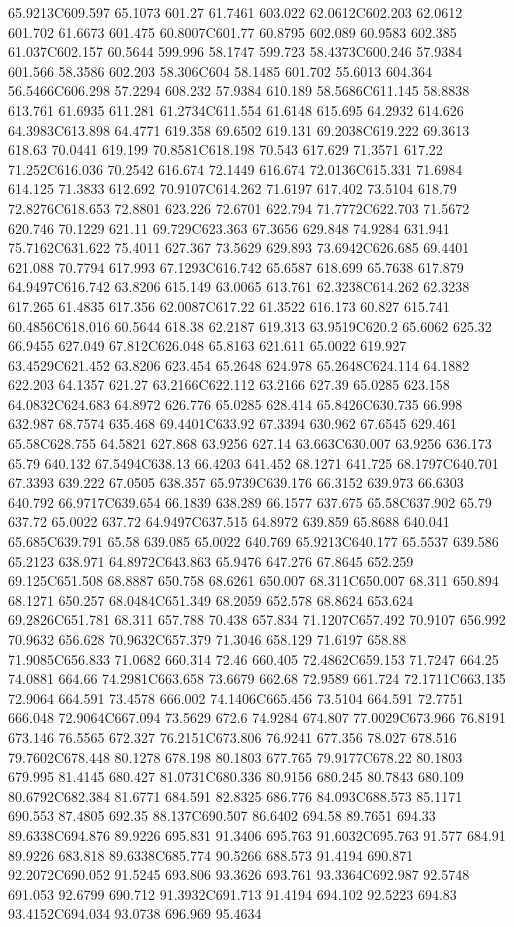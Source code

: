65.9213C609.597 65.1073 601.27 61.7461 603.022 62.0612C602.203 62.0612 601.702 61.6673 601.475 60.8007C601.77 60.8795 602.089 60.9583 602.385 61.037C602.157 60.5644 599.996 58.1747 599.723 58.4373C600.246 57.9384 601.566 58.3586 602.203 58.306C604 58.1485 601.702 55.6013 604.364 56.5466C606.298 57.2294 608.232 57.9384 610.189 58.5686C611.145 58.8838 613.761 61.6935 611.281 61.2734C611.554 61.6148 615.695 64.2932 614.626 64.3983C613.898 64.4771 619.358 69.6502 619.131 69.2038C619.222 69.3613 618.63 70.0441 619.199 70.8581C618.198 70.543 617.629 71.3571 617.22 71.252C616.036 70.2542 616.674 72.1449 616.674 72.0136C615.331 71.6984 614.125 71.3833 612.692 70.9107C614.262 71.6197 617.402 73.5104 618.79 72.8276C618.653 72.8801 623.226 72.6701 622.794 71.7772C622.703 71.5672 620.746 70.1229 621.11 69.729C623.363 67.3656 629.848 74.9284 631.941 75.7162C631.622 75.4011 627.367 73.5629 629.893 73.6942C626.685 69.4401 621.088 70.7794 617.993 67.1293C616.742 65.6587 618.699 65.7638 617.879 64.9497C616.742 63.8206 615.149 63.0065 613.761 62.3238C614.262 62.3238 617.265 61.4835 617.356 62.0087C617.22 61.3522 616.173 60.827 615.741 60.4856C618.016 60.5644 618.38 62.2187 619.313 63.9519C620.2 65.6062 625.32 66.9455 627.049 67.812C626.048 65.8163 621.611 65.0022 619.927 63.4529C621.452 63.8206 623.454 65.2648 624.978 65.2648C624.114 64.1882 622.203 64.1357 621.27 63.2166C622.112 63.2166 627.39 65.0285 623.158 64.0832C624.683 64.8972 626.776 65.0285 628.414 65.8426C630.735 66.998 632.987 68.7574 635.468 69.4401C633.92 67.3394 630.962 67.6545 629.461 65.58C628.755 64.5821 627.868 63.9256 627.14 63.663C630.007 63.9256 636.173 65.79 640.132 67.5494C638.13 66.4203 641.452 68.1271 641.725 68.1797C640.701 67.3393 639.222 67.0505 638.357 65.9739C639.176 66.3152 639.973 66.6303 640.792 66.9717C639.654 66.1839 638.289 66.1577 637.675 65.58C637.902 65.79 637.72 65.0022 637.72 64.9497C637.515 64.8972 639.859 65.8688 640.041 65.685C639.791 65.58 639.085 65.0022 640.769 65.9213C640.177 65.5537 639.586 65.2123 638.971 64.8972C643.863 65.9476 647.276 67.8645 652.259 69.125C651.508 68.8887 650.758 68.6261 650.007 68.311C650.007 68.311 650.894 68.1271 650.257 68.0484C651.349 68.2059 652.578 68.8624 653.624 69.2826C651.781 68.311 657.788 70.438 657.834 71.1207C657.492 70.9107 656.992 70.9632 656.628 70.9632C657.379 71.3046 658.129 71.6197 658.88 71.9085C656.833 71.0682 660.314 72.46 660.405 72.4862C659.153 71.7247 664.25 74.0881 664.66 74.2981C663.658 73.6679 662.68 72.9589 661.724 72.1711C663.135 72.9064 664.591 73.4578 666.002 74.1406C665.456 73.5104 664.591 72.7751 666.048 72.9064C667.094 73.5629 672.6 74.9284 674.807 77.0029C673.966 76.8191 673.146 76.5565 672.327 76.2151C673.806 76.9241 677.356 78.027 678.516 79.7602C678.448 80.1278 678.198 80.1803 677.765 79.9177C678.22 80.1803 679.995 81.4145 680.427 81.0731C680.336 80.9156 680.245 80.7843 680.109 80.6792C682.384 81.6771 684.591 82.8325 686.776 84.093C688.573 85.1171 690.553 87.4805 692.35 88.137C690.507 86.6402 694.58 89.7651 694.33 89.6338C694.876 89.9226 695.831 91.3406 695.763 91.6032C695.763 91.577 684.91 89.9226 683.818 89.6338C685.774 90.5266 688.573 91.4194 690.871 92.2072C690.052 91.5245 693.806 93.3626 693.761 93.3364C692.987 92.5748 691.053 92.6799 690.712 91.3932C691.713 91.4194 694.102 92.5223 694.83 93.4152C694.034 93.0738 696.969 95.4634 